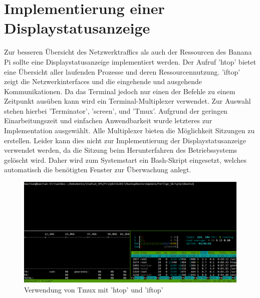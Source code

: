 \section{Implementierung einer Displaystatusanzeige}
Zur besseren Übersicht des Netzwerktraffics als auch der Ressourcen des Banana Pi sollte eine Displaystatusanzeige implementiert werden. Der Aufruf 'htop' bietet eine Übersicht aller laufenden Prozesse und deren Ressourcennutzung. 'iftop' zeigt die Netzwerkinterfaces und die eingehende und ausgehende Kommunikationen. Da das Terminal jedoch nur einen der Befehle zu einem Zeitpunkt ausüben kann wird ein Terminal-Multiplexer verwendet. Zur Auswahl stehen hierbei 'Terminator', 'screen', und 'Tmux'. Aufgrund der geringen Einarbeitungszeit und einfachen Anwendbarkeit wurde letzteres zur Implementation ausgewählt. Alle Multiplexer bieten die Möglichkeit Sitzungen zu erstellen. Leider kann dies nicht zur Implementierung der Displaystatusanzeige verwendet werden, da die Sitzung beim Herunterfahren des Betriebssystems gelöscht wird. Daher wird zum Systemstart ein Bash-Skript eingesetzt, welches automatisch die benötigten Fenster zur Überwachung anlegt. \cite {tmux}
\begin{figure}[ht]
\includegraphics[width=\textwidth]{pictures/Bastian/Tmux}
\caption{Verwendung von Tmux mit 'htop' und 'iftop'}
\end{figure}

